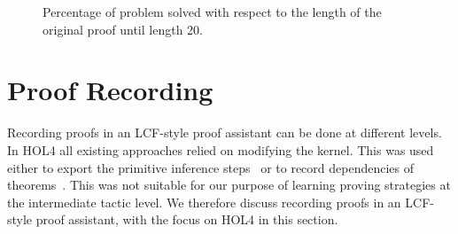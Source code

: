 \documentclass[runningheads,a4paper,draft]{svjour3}
\def\holfour{\textsf{HOL4}\xspace}
\def\eprover{\textsf{E-prover}\xspace}
\def\tactictoe{\textsf{TacticToe}\xspace}
\begin{document}
\begin{figure}[h]
\centering           
{}
\caption{Percentage of problem solved with respect to the length of the 
original proof until length 20.}
\end{figure}


% 

\section{Proof Recording}\label{sec:recording}

Recording proofs in an LCF-style proof assistant can be done at different 
levels.
In \holfour all existing approaches relied on modifying the kernel. This was 
used
either to export the primitive inference 
steps~\cite{Wong95recordingand,DBLP:conf/itp/KumarH12}
or to record dependencies of theorems~\cite{tgck-cpp15}. This was not suitable 
for our
purpose of learning proving strategies at the intermediate tactic level. We 
therefore
discuss recording proofs in an LCF-style proof assistant, with the focus on 
\holfour
in this section.


\end{document}

